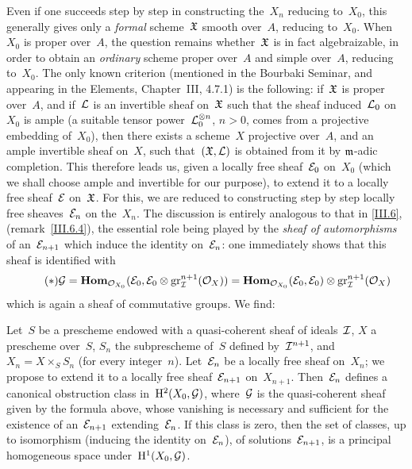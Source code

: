 Even if one succeeds step by step in constructing the~$X_n$
reducing to~$X_0$, this generally gives only a \emph{formal}
scheme~$\goth{X}$ smooth over~$A$, reducing to~$X_0$. When~$X_0$
is proper over~$A$, the question remains whether~$\goth{X}$ is in
fact algebraizable, in order to obtain an \emph{ordinary} scheme
proper over~$A$ and simple over~$A$, reducing to~$X_0$. The only
known criterion (mentioned in the Bourbaki Seminar, and appearing
in the Elements, Chapter~III, 4.7.1) is the following: if~$\goth{X}$
is proper over~$A$, and if~$\cal{L}$ is an invertible sheaf on~$\goth{X}$
such that the sheaf induced~$\cal{L}_0$ on~$X_0$ is ample (\ie a suitable
tensor power~$\cal{L}_0^{\otimes n}$, $n>0$, comes from a projective
embedding of~$X_0$), then there exists a scheme~$X$ projective over~$A$,
and an ample invertible sheaf on~$X$, such that~$(\goth{X},\cal{L})$
is obtained from it by $\goth{m}$-adic completion. This therefore
leads us, given a locally free sheaf~$\cal{E}_0$ on~$X_0$ (which we
shall choose ample and invertible for our purpose), to extend it to
a locally free sheaf~$\cal{E}$ on~$\goth{X}$. For this, we are
reduced to constructing step by step locally free sheaves~$\cal{E}_n$
on the~$X_n$. The discussion is entirely analogous to that in
\No\ref{III.6}, (\cf remark~\ref{III.6.4}), the essential role being
played by the \emph{sheaf of automorphisms} of an~$\cal{E}_{n+1}$
which induce the identity on~$\cal{E}_n$: one immediately shows that
this sheaf is identified with
\begin{equation*}
\label{eq:III.7.*}\tag{$*$}{}
\cal{G}= \SheafHom_{\cal{O}_{X_0}}(\cal{E}_0,
\cal{E}_0\otimes\gr_{\cal{I}}^{n+1}(\cal{O}_X))=
\SheafHom_{\cal{O}_{X_0}}(\cal{E}_0,
\cal{E}_0)\otimes\gr_{\cal{I}}^{n+1}(\cal{O}_X)
\end{equation*}
which is again a sheaf of commutative groups. We find:

\begin{proposition}\label{III.7.1}
Let~$S$ be a prescheme endowed with a quasi-coherent sheaf of
ideals~$\cal{I}$, $X$ a prescheme over~$S$, $S_n$ the subprescheme
of~$S$ defined by~$\cal{I}^{n+1}$, and~$X_n=X\times_SS_n$ (for every
integer~$n$). Let~$\cal{E}_n$ be a locally free sheaf
%
%
on~$X_n$; we propose to extend it to a locally free sheaf~$\cal{E}_{n+1}$
on~$X_{n+1}$. Then~$\cal{E}_n$ defines a canonical obstruction class
in~$\H^2(X_0,\cal{G})$, where~$\cal{G}$ is the quasi-coherent sheaf
given by the formula above, whose vanishing is necessary and
sufficient for the existence of an~$\cal{E}_{n+1}$ extending~$\cal{E}_n$.
If this class is zero, then the set of classes, up to isomorphism
(inducing the identity on~$\cal{E}_n$), of solutions~$\cal{E}_{n+1}$,
is a principal homogeneous space under~$\H^1(X_0,\cal{G})$.
\end{proposition}

